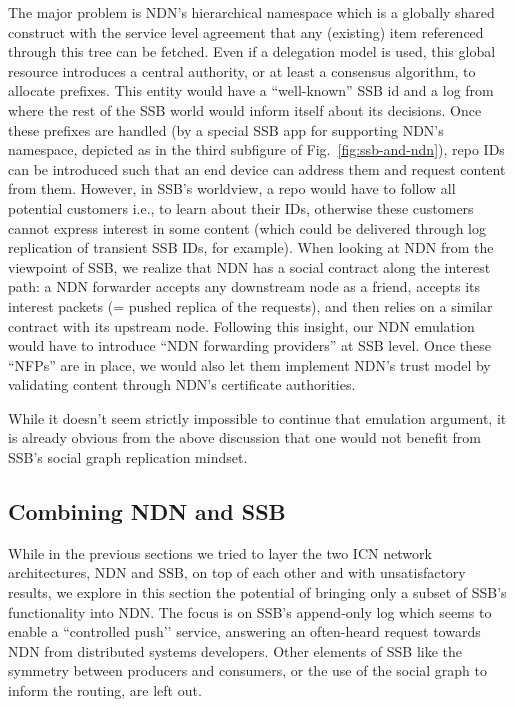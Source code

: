\documentclass[9pt,sigconf]{acmart}
\begin{document}
The major problem is NDN's hierarchical namespace which is a globally
shared construct with the service level agreement that any (existing)
item referenced through this tree can be fetched.  Even if a
delegation model is used, this global resource introduces a central
authority, or at least a consensus algorithm, to allocate
prefixes. This entity would have a ``well-known'' SSB id and a log
from where the rest of the SSB world would inform itself about its
decisions. Once these prefixes are handled (by a special SSB app for
supporting NDN's namespace, depicted as  in the third subfigure of Fig.~\ref{fig:ssb-and-ndn}), repo IDs
can be introduced such that an end device can address them and request
content from them. However, in SSB's worldview, a repo would have to
follow all potential customers i.e., to learn about their IDs,
otherwise these customers cannot express interest in some content
(which could be delivered through log replication of transient SSB
IDs, for example). When looking at NDN from the viewpoint of SSB,
 we realize that NDN has a social contract along the interest path:
 a NDN forwarder accepts any downstream node as a friend, accepts its interest packets (= pushed
replica of the requests), and then relies on a similar contract with
its upstream node. Following this insight, our NDN emulation would
have to introduce ``NDN forwarding providers'' at SSB level. Once
these ``NFPs'' are in place, we would also let them implement
NDN's trust model by validating content through NDN's certificate
authorities.

While it doesn't seem strictly impossible to continue that emulation
argument, it is already obvious from the above discussion that one
would not benefit from SSB's social graph replication mindset.


\subsection{Combining NDN and SSB}
\label{ssect:combining}


While in the previous sections we tried to layer the two ICN network
architectures, NDN and SSB, on top of each other and with
unsatisfactory results, we explore in this section the potential of
bringing only a subset of SSB’s functionality into NDN. The focus is
on SSB’s append-only log which seems to enable a ``controlled push’’
service, answering an often-heard request towards NDN from
distributed systems developers. Other elements of SSB like the
symmetry between producers and consumers, or the use of the social
graph to inform the routing, are left out.
\end{document}
